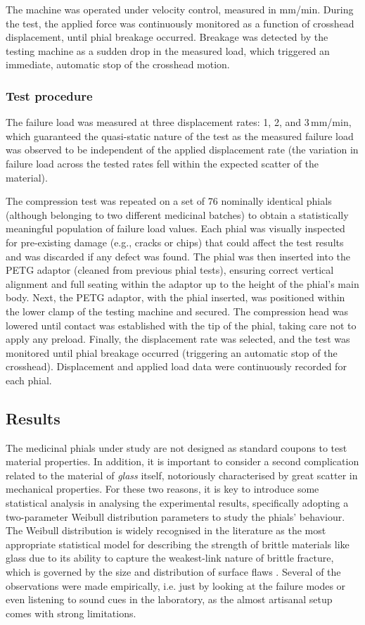 The machine was operated under velocity control, measured in mm/min. During the test, the applied force was continuously monitored as a function of crosshead displacement, until phial breakage occurred. Breakage was detected by the testing machine as a sudden drop in the measured load, which triggered an immediate, automatic stop of the crosshead motion.


\subsubsection{Test procedure}\label{sec:test-procedure}
The failure load was measured at three displacement rates: 1, 2, and 3\,mm/min, which guaranteed the quasi-static nature of the test as the measured failure load was observed to be independent of the applied displacement rate (the variation in failure load across the tested rates fell within the expected scatter of the material).

The compression test was repeated on a set of 76 nominally identical phials (although belonging to two different medicinal batches) to obtain a statistically meaningful population of failure load values. Each phial was visually inspected for pre-existing damage (e.g., cracks or chips) that could affect the test results and was discarded if any defect was found. The phial was then inserted into the PETG adaptor (cleaned from previous phial tests), ensuring correct vertical alignment and full seating within the adaptor up to the height of the phial's main body. Next, the PETG adaptor, with the phial inserted, was positioned within the lower clamp of the testing machine and secured. The compression head was lowered until contact was established with the tip of the phial, taking care not to apply any preload. Finally, the displacement rate was selected, and the test was monitored until phial breakage occurred (triggering an automatic stop of the crosshead). Displacement and applied load data were continuously recorded for each phial.



\subsection{Results}\label{sec:step1-results}
The medicinal phials under study are not designed as standard coupons to test material properties. In addition, it is important to consider a second complication related to the material of \textit{glass} itself, notoriously characterised by great scatter in mechanical properties. For these two reasons, it is key to introduce some statistical analysis in analysing the experimental results, specifically adopting a two-parameter Weibull distribution parameters to study the phials' behaviour. The Weibull distribution is widely recognised in the literature as the most appropriate statistical model for describing the strength of brittle materials like glass due to its ability to capture the weakest-link nature of brittle fracture, which is governed by the size and distribution of surface flaws \cite{datsiou2018weibull}. Several of the observations were made empirically, i.e. just by looking at the failure modes or even listening to sound cues in the laboratory, as the almost artisanal setup comes with strong limitations.


